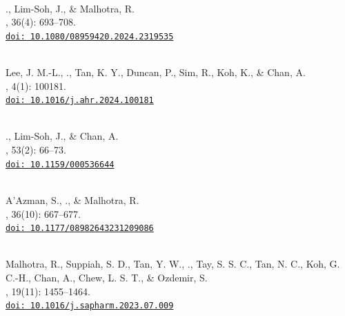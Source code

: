\begin{aka}
    \item [2024]
    \\ \lastfirst., Lim-Soh, J., \& Malhotra, R.
    \\ , 36(4): 693--708.
    \\ \href{https://www.tandfonline.com/doi/full/10.1080/08959420.2024.2319535?src=exp-la}{\texttt{doi: 10.1080/08959420.2024.2319535}}

    \item [2024]
    \\ Lee, J. M.-L., \lastfirst., Tan, K. Y., Duncan, P., Sim, R., Koh, K., \& Chan, A.
    \\ , 4(1): 100181.
    \\ \href{https://www.sciencedirect.com/science/article/pii/S2667032124000027}{\texttt{doi: 10.1016/j.ahr.2024.100181}}

    \item [2024]
    \\ \lastfirst., Lim-Soh, J., \& Chan, A.
    \\ , 53(2): 66--73.
    \\ \href{https://karger.com/dem/article/doi/10.1159/000536644/896747/Feeling-Alone-Together-Loneliness-in-Older-Adults}{\texttt{doi: 10.1159/000536644}}


    \item [2024]
    \\ A'Azman, S., \lastfirst., \& Malhotra, R.
    \\ , 36(10): 667--677.
    \\ \href{https://journals.sagepub.com/doi/10.1177/08982643231209086}{\texttt{doi: 10.1177/08982643231209086}}

    \item [2023]
    \\ Malhotra, R., Suppiah, S. D., Tan, Y. W., \lastfirst., Tay, S. S. C., Tan, N. C., Koh, G. C.-H., Chan, A., Chew, L. S. T., \& Ozdemir, S.
    \\ , 19(11): 1455--1464.
    \\ \href{https://doi.org/10.1016/j.sapharm.2023.07.009}{\texttt{doi: 10.1016/j.sapharm.2023.07.009}}


\end{aka}
